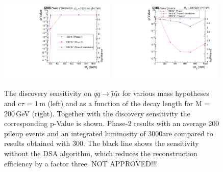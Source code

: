 \begin{figure}[hbtp]\begin{center}
\includegraphics[width=0.49\textwidth]{figures/SignificanceComp.pdf}
\includegraphics[width=0.49\textwidth]{figures/SignificanceComp_asfuncofCtau.pdf}
\caption{The discovery sensitivity on  $q \bar q \to \widetilde{\mu} \widetilde{\mu}$ 
for various mass hypotheses and c$\tau$ = 1\,m (left) and as a function of the decay length for M = 200\,GeV (right). Together with the discovery sensitivity the corresponding p-Value is shown. Phase-2 results with an average 200 pileup events and an integrated luminosity of 3000\fbinv are compared to results obtained with 300\fbinv. The black line shows the sensitivity without the DSA algorithm, which reduces the reconstruction efficiency by a factor three. NOT APPROVED!!!
 }
\label{fig:displResultsSensitiviy}
\end{center}
\end{figure}


